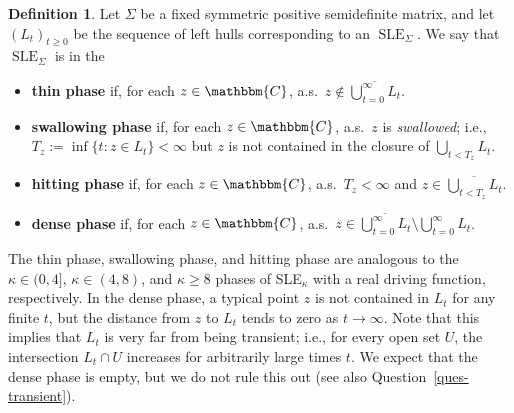 \documentclass[11pt]{article}
\theoremstyle{plain}
\theoremstyle{definition}
\newtheorem{defn}[thm]{Definition}
\numberwithin{equation}{section}
\newcommand{\BB}{\mathbbm}
\newcommand{\ol}{\overline}
\newcommand{\rta}{\rightarrow}
\newcommand{\SLEG}{{\operatorname{SLE}}_\Sigma}
\begin{document}
\begin{defn}  \label{defn-phases}
Let $\Sigma$ be a fixed symmetric positive semidefinite matrix, and let $(L_t)_{t \geq 0}$ be the sequence of left hulls corresponding to an $\SLEG$.  We say that $\SLEG$ is in the
\begin{itemize}
    \item \textbf{thin phase} if, for each $z \in \BB{C}$, a.s.\ $z \notin \ol{\bigcup_{t=0}^{\infty} L_t}$.  
    \item \textbf{swallowing phase} if, for each $z \in \BB{C}$, a.s.\ $z$ is \emph{swallowed}; i.e., $T_z := \inf\{t : z \in  L_t\} < \infty$ but $z$ is not contained in the closure of $\bigcup_{t<T_z} L_t$. 
    \item \textbf{hitting phase}  if,  for each $z \in \BB{C}$, a.s.\ $T_z < \infty$ and $z \in \ol{\bigcup_{t < T_z} L_t}$.
    \item \textbf{dense phase}  if,  for each $z \in \BB{C}$, a.s.\ $z \in \ol{\bigcup_{t = 0}^\infty L_t} \setminus \bigcup_{t=0}^\infty L_t$.
\end{itemize}
\end{defn}

The thin phase, swallowing phase, and hitting phase are analogous to the $\kappa \in (0,4]$, $\kappa \in (4,8)$, and $\kappa \geq 8$ phases of SLE$_\kappa$ with a real driving function, respectively. In the dense phase, a typical point $z$ is not contained in $L_t$ for any finite $t$, but the distance from $z$ to $L_t$ tends to zero as $t\rta\infty$. Note that this implies that $L_t$ is very far from being transient; i.e., for every open set $U$, the intersection $L_t\cap U$ increases for arbitrarily large times $t$. We expect that the dense phase is empty, but we do not rule this out (see also Question~\ref{ques-transient}). 
\end{document}
